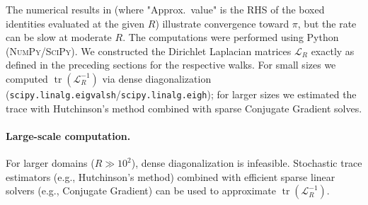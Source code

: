 \documentclass[reqno]{amsart}
\numberwithin{equation}{section}
\theoremstyle{definition}
\theoremstyle{remark}
\DeclareMathOperator{\tr}{tr}
\begin{document}
The numerical results in  (where "Approx.\ value" is the RHS of the boxed identities evaluated at the given $R$) illustrate convergence toward $\pi$, but the rate can be slow at moderate $R$. The computations were performed using Python (\textsc{NumPy}/\textsc{SciPy}). We constructed the Dirichlet Laplacian matrices $\mathcal{L}_R$ exactly as defined in the preceding sections for the respective walks. For small sizes we computed $\tr(\mathcal{L}_R^{-1})$ via dense diagonalization (\texttt{scipy.linalg.eigvalsh}/\texttt{scipy.linalg.eigh}); for larger sizes we estimated the trace with Hutchinson's method combined with sparse Conjugate Gradient solves.

\paragraph{Large-scale computation.} For larger domains ($R \gg 10^2$), dense diagonalization is infeasible. Stochastic trace estimators (e.g., Hutchinson's method) combined with efficient sparse linear solvers (e.g., Conjugate Gradient) can be used to approximate $\tr(\mathcal{L}_R^{-1})$.
\end{document}
